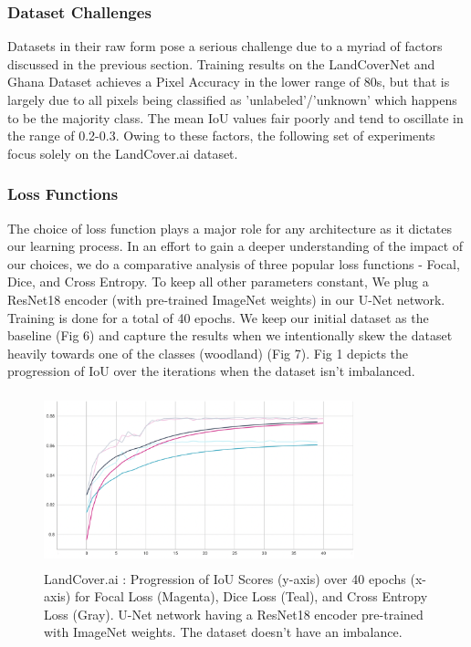 \documentclass[conference]{IEEEtran}
\begin{document}
\subsubsection{Dataset Challenges}
Datasets in their raw form pose a serious challenge due to a myriad of factors discussed in the previous section. Training results on the LandCoverNet and Ghana Dataset achieves a Pixel Accuracy in the lower range of 80s, but that is largely due to all pixels being classified as 'unlabeled'/'unknown' which happens to be the majority class. The mean IoU values fair poorly and tend to oscillate in the range of 0.2-0.3. Owing to these factors, the following set of experiments focus solely on the LandCover.ai dataset.

\subsubsection{Loss Functions} The choice of loss function plays a major role for any architecture as it dictates our learning process. In an effort to gain a deeper understanding of the impact of our choices, we do a comparative analysis of three popular loss functions - Focal, Dice, and Cross Entropy. To keep all other parameters constant, We plug a ResNet18 encoder (with pre-trained ImageNet weights) in our U-Net network. Training is done for a total of 40 epochs. We keep our initial dataset as the baseline (Fig 6) and capture the results when we intentionally skew the dataset heavily towards one of the classes (woodland) (Fig 7). Fig 1 depicts the progression of IoU over the iterations when the dataset isn't imbalanced.
\usepackage{float}

\begin{figure}[!h]
    \includegraphics[width=9cm, height=5cm]{images/roads-losses/three-losses-iou.png}
    \caption{LandCover.ai : Progression of IoU Scores (y-axis) over 40 epochs (x-axis) for Focal Loss (Magenta), Dice Loss (Teal), and Cross Entropy Loss (Gray). U-Net network having a ResNet18 encoder pre-trained with ImageNet weights. The dataset doesn't have an imbalance. }
\end{figure}
\end{document}
